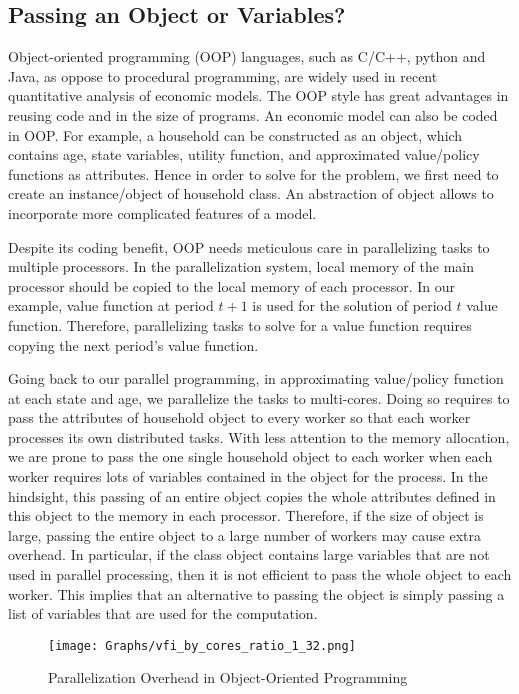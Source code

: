 \documentclass[12pt]{article}
\begin{document}
\subsection{Passing an Object or Variables?}
Object-oriented programming (OOP) languages, such as C/C++, python and Java, as oppose to procedural programming, are widely used in recent quantitative analysis of economic models. The OOP style has great advantages in reusing code and in the size of programs. An economic model can also be coded in OOP. For example, a household can be constructed as an object, which contains age, state variables, utility function, and approximated value/policy functions as attributes. Hence in order to solve for the problem, we first need to create an instance/object of household class. An abstraction of object allows to incorporate more complicated features of a model.

Despite its coding benefit, OOP needs meticulous care in parallelizing tasks to multiple processors. In the parallelization system, local memory of the main processor should be copied to the local memory of each processor. In our example, value function at period $t+1$ is used for the solution of period $t$ value function. Therefore, parallelizing tasks to solve for a value function requires copying the next period's value function.

Going back to our parallel programming, in approximating value/policy function at each state and age, we parallelize the tasks to multi-cores. Doing so requires to pass the attributes of household object to every worker so that each worker processes its own distributed tasks. With less attention to the memory allocation, we are prone to pass the one single household object to each worker when each worker requires lots of variables contained in the object for the process. In the hindsight, this passing of an entire object copies the whole attributes defined in this object to the memory in each processor. Therefore, if the size of object is large, passing the entire object to a large number of workers may cause extra overhead. In particular, if the class object contains large variables that are not used in parallel processing, then it is not efficient to pass the whole object to each worker. This implies that an alternative to passing the object is simply passing a list of variables that are used for the computation.



\begin{figure}[t!]
\sf
\begin{center}
\caption{\sf Parallelization Overhead in Object-Oriented Programming}
\texttt{[image: Graphs/vfi\_by\_cores\_ratio\_1\_32.png]}\label{fig:po_oop}
\end{center}
\end{figure}
\end{document}
